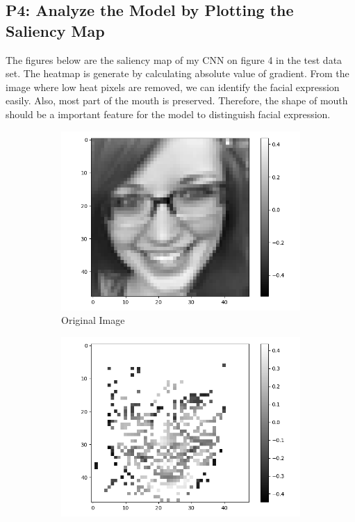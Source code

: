 \documentclass[fleqn,a4paper,12pt]{article}
\begin{document}
\subsection*{P4: Analyze the Model by Plotting the Saliency Map}

The figures below are the saliency map of my CNN on figure 4 in the test data set. The heatmap is generate by calculating absolute value of gradient. From the image where low heat pixels are removed, we can identify the facial expression easily. Also, most part of the mouth is preserved. Therefore, the shape of mouth should be a important feature for the model to distinguish facial expression.

\begin{figure}[h]
\centering
\begin{subfigure}{.33\textwidth}
  \centering
  \includegraphics[width=\linewidth]{report-imgs/sa-orig.png}
  \caption{Original Image}
  \label{fig:sub1}
\end{subfigure}%
\begin{subfigure}{.33\textwidth}
  \centering
  \includegraphics[width=\linewidth]{report-imgs/sa-rm-low-heat.png}

\end{subfigure}
\end{figure}
\end{document}
